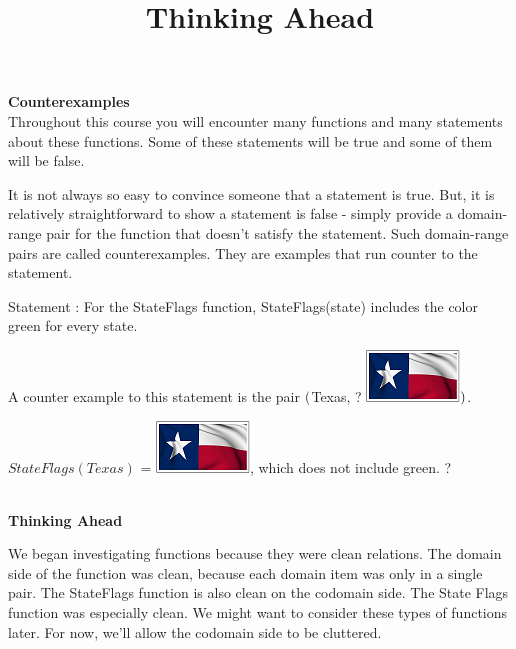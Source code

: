 \documentclass{ximera}
\title{Thinking Ahead}
\begin{document}
\begin{abstract}
\end{abstract}

\maketitle




\textbf{Counterexamples} \\

Throughout this course you will encounter many functions and many statements about these functions.  Some of these statements will be true and some of them will be false.

It is not always so easy to convince someone that a statement is true.  But, it is relatively straightforward to show a statement is false - simply provide a domain-range pair for the function that doesn't satisfy the statement. Such domain-range pairs are called counterexamples.  They are examples that run counter to the statement.
\quad \\

\begin{example}

Statement : For the StateFlags function, StateFlags(state) includes the color green for every state.

A counter example to this statement is the pair $\Large{(}$Texas, ? \includegraphics{pics/StateFlags/Texas.png}$\Large{)}$.

$StateFlags(Texas)$ = \includegraphics{pics/StateFlags/Texas.png}, which does not include green.  
?
\end{example}
\quad \\


\textbf{Thinking Ahead}\ \

We began investigating functions because they were clean relations.  The domain side of the function was clean, because each domain item was only in a single pair.  The StateFlags function is also clean on the codomain side.  The State Flags function was especially clean. We might want to consider these types of functions later.  For now, we'll allow the codomain side to be cluttered.
\quad \\
\end{document}
